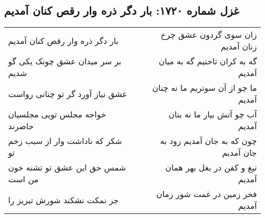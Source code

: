 \begin{center}
\section*{غزل شماره ۱۷۲۰: بار دگر ذره وار رقص کنان آمدیم}
\label{sec:1720}
\begin{longtable}{l p{0.5cm} r}
بار دگر ذره وار رقص کنان آمدیم
&&
زان سوی گردون عشق چرخ زنان آمدیم
\\
بر سر میدان عشق چونک یکی گو شدیم
&&
گه به کران تاختیم گه به میان آمدیم
\\
عشق نیاز آورد گر تو چنانی رواست
&&
ما چو از آن سوتریم ما نه چنان آمدیم
\\
خواجه مجلس تویی مجلسیان حاضرند
&&
آب چو آتش بیار ما نه بنان آمدیم
\\
شکر که ناداشت وار از سبب زخم تو
&&
چون که به جان آمدیم زود به جان آمدیم
\\
شمس حق این عشق تو تشنه خون من است
&&
تیغ و کفن در بغل بهر همان آمدیم
\\
جز نمکت نشکند شورش تبریز را
&&
فخر زمین در غمت شور زمان آمدیم
\\
\end{longtable}
\end{center}
